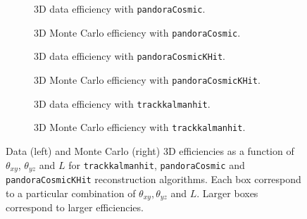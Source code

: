 \documentclass[a4paper]{scrartcl}
\begin{document}
\begin{figure}[htbp]
\begin{subfigure}{0.5\textwidth}
\caption{3D data efficiency with \texttt{pandoraCosmic}.} \label{fig:pandora_3D}
\end{subfigure}
\hspace*{\fill}
\begin{subfigure}{0.5\textwidth}
\caption{3D Monte Carlo efficiency with \texttt{pandoraCosmic}.}\label{fig:pandora_3D_mc}
\end{subfigure}
\begin{subfigure}{0.5\textwidth}
\caption{3D data efficiency with \texttt{pandoraCosmicKHit}.} \label{fig:pandoraKHit_3D}
\end{subfigure}
\hspace*{\fill}
\begin{subfigure}{0.5\textwidth}
\caption{3D Monte Carlo efficiency with \texttt{pandoraCosmicKHit}.}\label{fig:pandoraKHit_3D_mc}
\end{subfigure}
\begin{subfigure}{0.5\textwidth}
\caption{3D data efficiency with \texttt{trackkalmanhit}.} \label{fig:tk_3D}
\end{subfigure}
\hspace*{\fill}
\begin{subfigure}{0.5\textwidth}
\caption{3D Monte Carlo efficiency with \texttt{trackkalmanhit}.}\label{fig:tk_3D_mc}
\end{subfigure}
\caption{Data (left) and Monte Carlo (right) 3D efficiencies  as a function of $\theta_{xy}$, $\theta_{yz}$ and $L$ for \texttt{track\-kal\-man\-hit}, \texttt{pan\-do\-ra\-Co\-smic} and \texttt{pan\-do\-ra\-Co\-smicKHit} reconstruction algorithms. Each box correspond to a particular combination of $\theta_{xy}, \theta_{yz}$ and $L$. Larger boxes correspond to larger efficiencies.} \label{fig:3Deff}
\end{figure}
\end{document}
